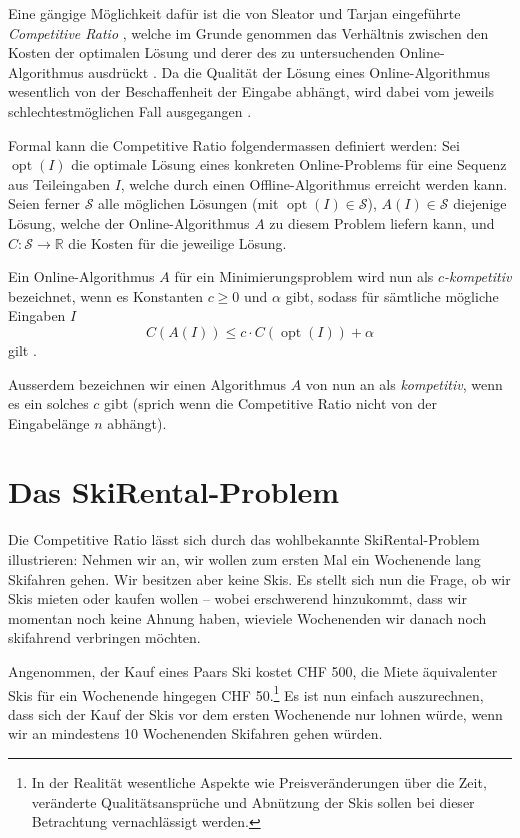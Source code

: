 \documentclass[11pt,abstracton]{scrreprt} %
\theoremstyle{definition}
\begin{document}
Eine gängige Möglichkeit dafür ist die von Sleator und Tarjan eingeführte {\it Competitive Ratio} \cite{Sleator, BKK}, welche im Grunde genommen das Verhältnis zwischen den Kosten der optimalen Lösung und derer des zu untersuchenden Online-Algorithmus ausdrückt \cite{BKK}. Da die Qualität der Lösung eines Online-Algorithmus wesentlich von der Beschaffenheit der Eingabe abhängt, wird dabei vom jeweils schlechtestmöglichen Fall ausgegangen \cite{Trevisan}.

\bigskip
Formal kann die Competitive Ratio folgendermassen definiert werden: Sei $\operatorname{opt}(I)$ die optimale Lösung eines konkreten Online-Problems für eine Sequenz aus Teileingaben $I$, welche durch einen Offline-Algorithmus erreicht werden kann.
Seien ferner $\mathcal{S}$ alle möglichen Lösungen (mit $\operatorname{opt}(I) \in \mathcal{S}$), $A(I) \in \mathcal{S}$ diejenige Lösung, welche der Online-Algorithmus $A$ zu diesem Problem liefern kann, und $C : \mathcal{S} \rightarrow \mathbb{R}$ die Kosten für die jeweilige Lösung.

\bigskip
Ein Online-Algorithmus $A$ für ein Minimierungsproblem wird nun als {\it $c$-kompetitiv} bezeichnet, wenn es Konstanten $c \ge 0$ und $\alpha$ gibt, sodass für sämtliche mögliche Eingaben $I$
\[
C(A(I)) \le c\cdot C(\operatorname{opt}(I)) + \alpha
\]
gilt \cite{BKK}.

Ausserdem bezeichnen wir einen Algorithmus $A$ von nun an als {\sl kompetitiv}, wenn es ein solches $c$ gibt (sprich wenn die Competitive Ratio nicht von der Eingabelänge $n$ abhängt).

\section{Das {\sc SkiRental}-Problem}

Die Competitive Ratio lässt sich durch das wohlbekannte {\sc SkiRental}-Problem illustrieren: Nehmen wir an, wir wollen zum ersten Mal ein Wochenende lang Skifahren gehen. Wir besitzen aber keine Skis. Es stellt sich nun die Frage, ob wir Skis mieten oder kaufen wollen -- wobei erschwerend hinzukommt, dass wir momentan noch keine Ahnung haben, wieviele Wochenenden wir danach noch skifahrend verbringen möchten.

Angenommen, der Kauf eines Paars Ski kostet CHF 500, die Miete äquivalenter Skis für ein Wochenende hingegen CHF 50.\footnote{In der Realität wesentliche Aspekte wie Preisveränderungen über die Zeit, veränderte Qualitätsansprüche und Abnützung der Skis sollen bei dieser Betrachtung vernachlässigt werden.} Es ist nun einfach auszurechnen, dass sich der Kauf der Skis vor dem ersten Wochenende nur lohnen würde, wenn wir an mindestens 10 Wochenenden Skifahren gehen würden.
\end{document}
